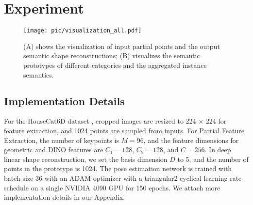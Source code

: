 \section{Experiment} \label{sec:experiment}
\begin{figure*}[t] %
    \hspace*{\fill} %
    \begin{minipage}[t]{1.0\textwidth} %
        \centering
        \texttt{[image: pic/visualization\_all.pdf]} %
        \vspace{-0.5cm}
        \caption{(A) shows the visualization of input partial points and the output semantic shape reconstructions; (B) visualizes the semantic prototypes of different categories and the aggregated instance semantics.}
        \vspace{-0.4cm}
        \label{fig:vis_intra_variance}
    \end{minipage}
\end{figure*}

\subsection{Implementation Details}
For the HouseCat6D dataset \cite{jung2024housecat6d}, cropped images are resized to 224 $\times$ 224 for feature extraction, and 1024 points are sampled from inputs. For Partial Feature Extraction, the number of keypoints is $M = 96$, and the feature dimensions for geometric and DINO features are $C_1 = 128$, $C_2 = 128$, and $C = 256$. In deep linear shape reconstruction, we set the basis dimension $D$ to 5, and the number of points in the prototype is 1024. The pose estimation network is trained with batch size 36 with an ADAM \cite{Kingma2014AdamAM} optimizer with a triangular2 cyclical learning rate schedule \cite{smith2017cyclical} on a single NVIDIA 4090 GPU for 150 epochs. We attach more implementation details in our Appendix.

